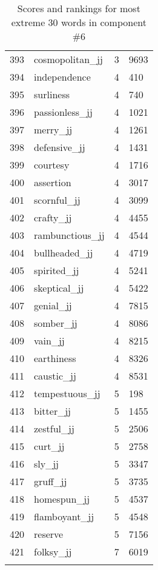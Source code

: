 \begin{longtable}[!htbp]{| rlr@{.}l |}
    393 & cosmopolitan\_jj & 3 & 9693 \\
    394 & independence & 4 & 410 \\
    395 & surliness & 4 & 740 \\
    396 & passionless\_jj & 4 & 1021 \\
    397 & merry\_jj & 4 & 1261 \\
    398 & defensive\_jj & 4 & 1431 \\
    399 & courtesy & 4 & 1716 \\
    400 & assertion & 4 & 3017 \\
    401 & scornful\_jj & 4 & 3099 \\
    402 & crafty\_jj & 4 & 4455 \\
    403 & rambunctious\_jj & 4 & 4544 \\
    404 & bullheaded\_jj & 4 & 4719 \\
    405 & spirited\_jj & 4 & 5241 \\
    406 & skeptical\_jj & 4 & 5422 \\
    407 & genial\_jj & 4 & 7815 \\
    408 & somber\_jj & 4 & 8086 \\
    409 & vain\_jj & 4 & 8215 \\
    410 & earthiness & 4 & 8326 \\
    411 & caustic\_jj & 4 & 8531 \\
    412 & tempestuous\_jj & 5 & 198 \\
    413 & bitter\_jj & 5 & 1455 \\
    414 & zestful\_jj & 5 & 2506 \\
    415 & curt\_jj & 5 & 2758 \\
    416 & sly\_jj & 5 & 3347 \\
    417 & gruff\_jj & 5 & 3735 \\
    418 & homespun\_jj & 5 & 4537 \\
    419 & flamboyant\_jj & 5 & 4548 \\
    420 & reserve & 5 & 7156 \\
    421 & folksy\_jj & 7 & 6019 \\
    \hline
    \caption{Scores and rankings for most extreme 30 words in component \#6} \\
\end{longtable}
